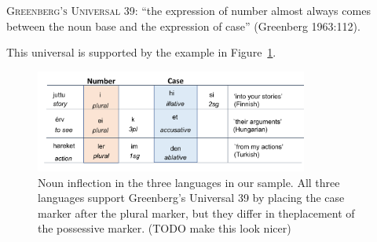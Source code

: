 \documentclass[11pt,letterpaper]{article}
\newcommand\mhahn[1]{{\color{red}(#1)}}
\begin{document}
\begin{adjustwidth}{6em}{6em}
\textsc{Greenberg's Universal 39}:
``the expression of number almost always comes between the noun base and the expression of case'' (Greenberg 1963:112).
\end{adjustwidth}
This universal is supported by the example in Figure~\ref{fig:noun-inflection}.



\begin{figure}
\includegraphics[width=0.8\textwidth]{figures/noun-morphemes.pdf}


\caption{Noun inflection in the three languages in our sample. All three languages support Greenberg's Universal 39 by placing the case marker after the plural marker, but they differ in theplacement of the possessive marker. \mhahn{TODO make this look nicer}}\label{fig:noun-inflection}
\end{figure}
\end{document}
